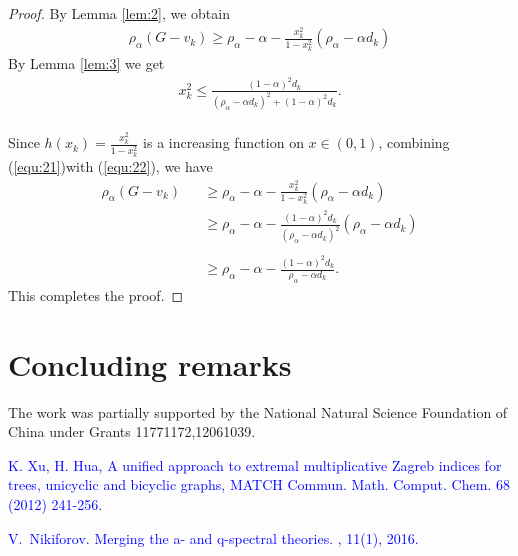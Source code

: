 \documentclass[amsthm]{elsart}
\begin{document}
\begin{proof}
By Lemma \ref {lem:2}, we obtain \\
\begin{eqnarray} \label{equ:21}
\rho _\alpha (G - v_k)
    \geqslant \rho _\alpha - \alpha - \frac{x_k^2}{1 - x_k^2} (\rho _\alpha - \alpha d_k)
\end{eqnarray}
By Lemma \ref {lem:3} we get
\begin{eqnarray} \label{equ:22}
x_k^2 \leqslant \frac{(1 - \alpha)^2 d_k}{(\rho _\alpha - \alpha d_k)^2 + (1 - \alpha)^2 d_k}.
\end{eqnarray}
\\
Since $h(x_k) = \frac{x_k^2}{1 - x_k^2} $ is a increasing function on $x \in (0, 1)$, combining (\ref{equ:21})with (\ref{equ:22}), we have  \\
\begin{eqnarray*}
\rho _\alpha (G - v_k) 
  &&\geqslant \rho _\alpha - \alpha - \frac{x_k^2}{1 - x_k^2} (\rho _\alpha - \alpha d_k)  
  \\ &&\geqslant \rho _\alpha - \alpha - \frac{(1 - \alpha)^2 d_k}{(\rho _\alpha - \alpha d_k)^2} (\rho _\alpha - \alpha d_k)  \\
  \\ &&\geqslant \rho _\alpha - \alpha - \frac{(1 - \alpha)^2 d_k}{\rho _\alpha - \alpha d_k}
.
\end{eqnarray*}
This completes the proof.
\end{proof}

\section{Concluding remarks}


\vskip4mm


 The work was partially supported by the National Natural Science Foundation of China under Grants 11771172,12061039.




\begin{thebibliography}{99}









\textcolor{blue}{ K. Xu, H. Hua, A unified approach to extremal
multiplicative Zagreb indices for trees, unicyclic and bicyclic
graphs, MATCH Commun. Math. Comput. Chem. 68 (2012) 241-256.}

\textcolor{blue}{
V.~Nikiforov.
\newblock Merging the a- and q-spectral theories.
, 11(1), 2016.}










\end{thebibliography}
\end{document}
